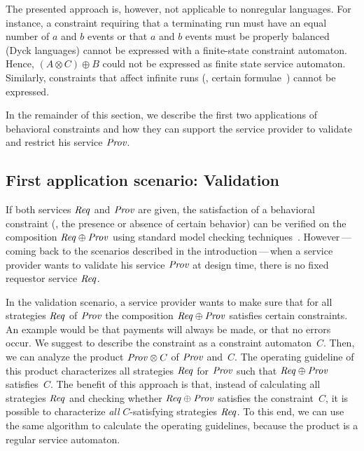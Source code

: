 The presented approach is, however, not applicable to nonregular languages. For instance, a constraint requiring that a terminating run must have an equal number of $a$ and $b$ events or that $a$ and $b$ events must be properly balanced (Dyck languages) cannot be expressed with a finite-state constraint automaton. Hence, $(A\otimes C)\oplus B$ could not be expressed as finite state service automaton. Similarly, constraints that affect infinite runs (\eg, certain  formulae~\cite{MannaP_1992_ltl}) cannot be expressed.

In the remainder of this section, we describe the first two applications of behavioral constraints and how they can support the service provider to validate and restrict his service $\mathit{Prov}$.




\subsection*{First application scenario: Validation}

If both services $\mathit{Req}$ and $\mathit{Prov}$ are given, the satisfaction of a behavioral constraint (\ie, the presence or absence of certain behavior) can be verified on the composition $\mathit{Req}\oplus \mathit{Prov}$ using standard model checking techniques~\cite{ClarkeGD_1999_book}. However\,---\,coming back to the scenarios described in the introduction\,---\,when a service provider wants to validate his service $\mathit{Prov}$ at design time, there is no fixed requestor service $\mathit{Req}$.

In the validation scenario, a service provider wants to make sure that for all strategies $\mathit{Req}$ of $\mathit{Prov}$ the composition $\mathit{Req} \oplus\mathit{Prov}$ satisfies certain constraints. An example would be that payments will always be made, or that no errors occur. We suggest to describe the constraint as a constraint automaton~$C$. Then, we can analyze the product $\mathit{Prov} \otimes C$ of $\mathit{Prov}$ and~$C$. The operating guideline of this product characterizes all strategies $\mathit{Req}$ for $\mathit{Prov}$ such that $\mathit{Req} \oplus \mathit{Prov}$ satisfies~$C$. The benefit of this approach is that, instead of calculating all strategies $\mathit{Req}$ and checking whether $\mathit{Req} \oplus \mathit{Prov}$ satisfies the constraint~$C$, it is possible to characterize \emph{all} $C$-satisfying strategies $\mathit{Req}$. To this end, we can use the same algorithm to calculate the operating guidelines, because the product is a regular service automaton.

